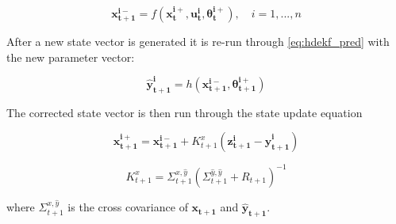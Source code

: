 \begin{equation}\label{eq:hdekf_predict_2}
\mathbf{x_{t+1}^{i-}} = f(\mathbf{x_{t}^{i+}}, \mathbf{u_{t}^{i}}, \mathbf{\theta^{i+}_{t}}), \quad i=1,...,n
\end{equation}

After a new state vector is generated it is re-run through \eqref{eq:hdekf_pred} with the new parameter vector:

\begin{equation}\label{eq:hdekf_pred_2}
\mathbf{\hat{y}_{t+1}^{i}} = h(\mathbf{x_{t+1}^{i-}}, \mathbf{\theta_{t+1}^{i+}})
\end{equation}

The corrected state vector is then run through the state update equation

\begin{equation}\label{eq:hdekf_state_update}
\mathbf{x_{t+1}^{i+}} = \mathbf{x_{t+1}^{i-}} + K_{t+1}^{x}(\mathbf{z_{t+1}^{i}}-\mathbf{\hat{y}_{t+1}^{i}})
\end{equation}
 
\begin{equation}\label{eq:hdekf_param_k}
K_{t+1}^{x} = \Sigma^{x,\hat{y}}_{t+1}(\Sigma^{\hat{y},\hat{y}}_{t+1} + R_{t+1})^{-1}
\end{equation}

where $\Sigma^{x,\hat{y}}_{t+1}$ is the cross covariance of $\mathbf{x_{t+1}}$ and $\mathbf{\hat{y}_{t+1}}$.



